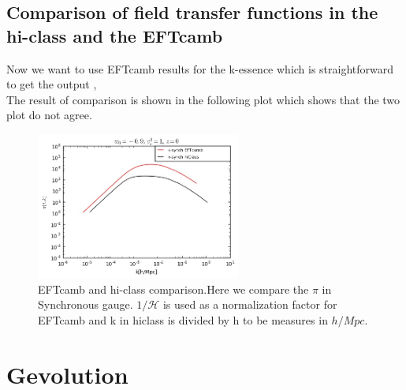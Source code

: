 \documentclass[a4paper,14pt]{article}
\begin{document}
\subsection{Comparison of field transfer functions in the hi-class and the EFTcamb}
Now we want to use EFTcamb results for the k-essence which is straightforward to get the output , \\
The result of comparison is shown in the following plot which shows that the two plot do not agree.
\begin{figure}[H]
\begin{center}
\captionsetup{,margin=1cm}
\includegraphics[width=0.60\textwidth]{eft_hiclass.jpg} 
\caption{EFTcamb and hi-class comparison.Here we compare the $\pi$ in Synchronous gauge. $1/\mathcal{H}$ is used as a  normalization factor for EFTcamb and k in hiclass is divided by h to be measures in $h/Mpc$.}
\end{center}
\end{figure}

\section{Gevolution}
\end{document}
